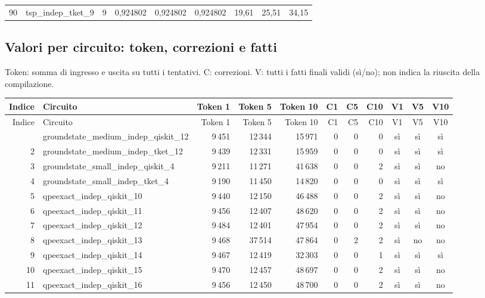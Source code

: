 \documentclass[a4paper,10pt]{article}
\begin{document}
\begin{landscape}
\begin{longtable}{r l r rrr rrr}
90 & tsp\_indep\_tket\_9 & 9 & 0,924802 & 0,924802 & 0,924802 & 19,61 & 25,51 & 34,15\\
\end{longtable}\endgroup\end{landscape}\clearpage\begin{landscape}\section{Valori per circuito: token, correzioni e fatti}
Token: somma di ingresso e uscita su tutti i tentativi. C: correzioni. V: tutti i fatti finali validi (sì/no); non indica la riuscita della compilazione.\par\begingroup\footnotesize\setlength{\tabcolsep}{4pt}\renewcommand{\arraystretch}{1.16}\begin{longtable}{r l rrr rrr ccc}\toprule Indice & Circuito & Token 1 & Token 5 & Token 10 & C1 & C5 & C10 & V1 & V5 & V10\\\midrule\endfirsthead\toprule Indice & Circuito & Token 1 & Token 5 & Token 10 & C1 & C5 & C10 & V1 & V5 & V10\\\midrule\endhead\bottomrule\endfoot
1 & groundstate\_medium\_indep\_qiskit\_12 & 9\,451 & 12\,344 & 15\,971 & 0 & 0 & 0 & sì & sì & sì\\
2 & groundstate\_medium\_indep\_tket\_12 & 9\,439 & 12\,331 & 15\,959 & 0 & 0 & 0 & sì & sì & sì\\
3 & groundstate\_small\_indep\_qiskit\_4 & 9\,211 & 11\,271 & 41\,638 & 0 & 0 & 2 & sì & sì & no\\
4 & groundstate\_small\_indep\_tket\_4 & 9\,190 & 11\,450 & 14\,820 & 0 & 0 & 0 & sì & sì & sì\\
5 & qpeexact\_indep\_qiskit\_10 & 9\,440 & 12\,150 & 46\,488 & 0 & 0 & 2 & sì & sì & no\\
6 & qpeexact\_indep\_qiskit\_11 & 9\,456 & 12\,407 & 48\,620 & 0 & 0 & 2 & sì & sì & no\\
7 & qpeexact\_indep\_qiskit\_12 & 9\,484 & 12\,401 & 47\,954 & 0 & 0 & 2 & sì & sì & no\\
8 & qpeexact\_indep\_qiskit\_13 & 9\,468 & 37\,514 & 47\,864 & 0 & 2 & 2 & sì & no & no\\
9 & qpeexact\_indep\_qiskit\_14 & 9\,467 & 12\,419 & 32\,303 & 0 & 0 & 1 & sì & sì & sì\\
10 & qpeexact\_indep\_qiskit\_15 & 9\,470 & 12\,457 & 48\,697 & 0 & 0 & 2 & sì & sì & no\\
11 & qpeexact\_indep\_qiskit\_16 & 9\,456 & 12\,450 & 48\,700 & 0 & 0 & 2 & sì & sì & no\\

\end{longtable}
\end{landscape}
\end{document}
